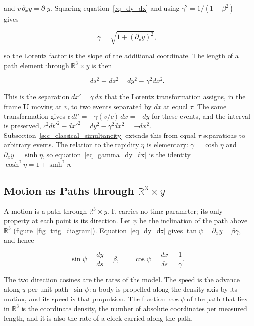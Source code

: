\documentclass[anonymous]{iopjournal}
\begin{document}
and $v\,\partial_x y=\partial_\tau y$. Squaring equation~\eqref{eq_dy_dx} and using $\gamma^2=1/(1-\beta^2)$ gives

\begin{equation}\label{eq_gamma_dy_dx}
    \gamma=\sqrt{1+\left(\partial_x y\right)^2},
\end{equation}

so the Lorentz factor is the slope of the additional coordinate. The length of a path element through $\mathbb{R}^3\times y$ is then

\begin{equation}\label{eq_path_length}
    ds^2=dx^2+dy^2=\gamma^2dx^2 .
\end{equation}

This is the separation $dx'=\gamma\,dx$ that the Lorentz transformation assigns, in the frame $\mathbf{U}$ moving at $v$, to two events separated by $dx$ at equal $\tau$. The same transformation gives $c\,dt'=-\gamma(v/c)\,dx=-dy$ for these events, and the interval is preserved, $c^2dt'^2-dx'^2=dy^2-\gamma^2dx^2=-dx^2$. Subsection~\ref{sec_classical_simultaneity} extends this from equal-$\tau$ separations to arbitrary events. The relation to the rapidity $\eta$ is elementary: $\gamma=\cosh\eta$ and $\partial_x y=\sinh\eta$, so equation~\eqref{eq_gamma_dy_dx} is the identity $\cosh^2\eta=1+\sinh^2\eta$.

\subsection{Motion as Paths through \texorpdfstring{$\mathbb{R}^3\times y$}{R3 x y}}\label{sec_paths}

A motion is a path through $\mathbb{R}^3\times y$. It carries no time parameter; its only property at each point is its direction. Let $\psi$ be the inclination of the path above $\mathbb{R}^3$ (figure~\ref{fig_trig_diagram}). Equation~\eqref{eq_dy_dx} gives $\tan\psi=\partial_x y=\beta\gamma$, and hence

\begin{equation}\label{eq_path_angle}
    \sin\psi=\frac{dy}{ds}=\beta,
    \qquad
    \cos\psi=\frac{dx}{ds}=\frac{1}{\gamma}.
\end{equation}

The two direction cosines are the rates of the model. The speed is the advance along $y$ per unit path, $\sin\psi$: a body is propelled along the density axis by its motion, and its speed is that propulsion. The fraction $\cos\psi$ of the path that lies in $\mathbb{R}^3$ is the coordinate density, the number of absolute coordinates per measured length, and it is also the rate of a clock carried along the path.
\end{document}
